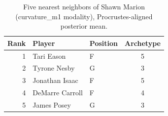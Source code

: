 \begin{table}[htbp]
  \centering\small
  \begin{tabular}{rllc}
    \toprule
    Rank & Player & Position & Archetype \\
    \midrule
    1 & Tari Eason & F & 5 \\
    2 & Tyrone Nesby & G & 3 \\
    3 & Jonathan Isaac & F & 5 \\
    4 & DeMarre Carroll & F & 4 \\
    5 & James Posey & G & 3 \\
    \bottomrule
  \end{tabular}
  \caption{Five nearest neighbors of Shawn Marion (curvature_m1 modality), Procrustes-aligned posterior mean.}
  \label{tab:Shawn_Marion_neighbors_curvature_m1}
\end{table}

